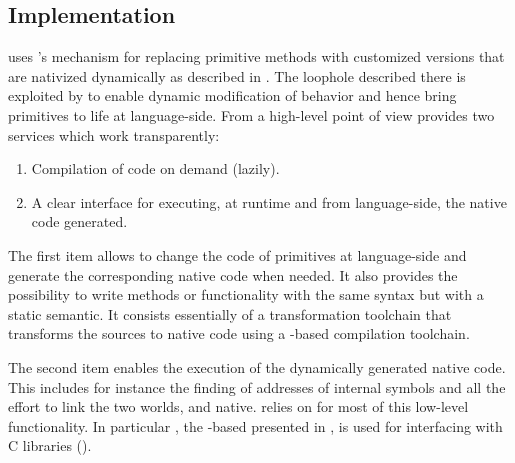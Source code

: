 \subsection{\WF Implementation}
\WF uses \B's mechanism for replacing primitive methods with customized versions that are nativized dynamically as described in .
The loophole described there is exploited by \WF to enable dynamic modification of \VM behavior and hence bring primitives to life at language-side.
From a high-level point of view \WF provides two services which work transparently: 

\begin{enumerate}
	\item Compilation of \Slang code on demand (lazily).
	\item A clear interface for executing, at runtime and from language-side, the native code generated.
\end{enumerate}

\noindent The first item allows to change the code of primitives at language-side and generate the corresponding native code when needed. 
It also provides the possibility to write methods or functionality with the same \ST syntax but with a static semantic. 
It consists essentially of a transformation toolchain that transforms the \Slang sources to native code using a \B-based compilation toolchain.

The second item enables the execution of the dynamically generated native code.
This includes for instance the finding of addresses of \VM internal symbols and all the effort to link the two worlds, \ST and native.
\WF relies on \B for most of this low-level functionality.
In particular \NB, the \B-based \FFI presented in , is used for interfacing with C libraries (). 

